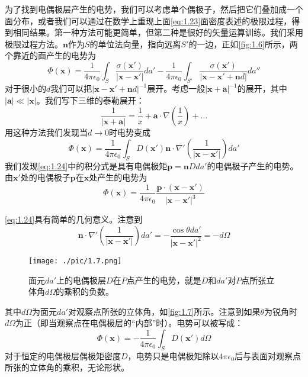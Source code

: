 \documentclass[12pt]{book}
\numberwithin{equation}{chapter}
\numberwithin{figure}{chapter}
\numberwithin{footnote}{page}
\begin{document}
为了找到电偶极层产生的电势，我们可以考虑单个偶极子，然后把它们叠加成一个面分布，或者我们可以通过在数学上重现上面\autoref{eq:1.23}面密度表述的极限过程，得到相同结果。第一种方法可能更简单，但第二种是很好的矢量运算训练。我们采用极限过程方法。$\mathbf{n}$作为$S$的单位法向量，指向远离$S'$的一边，正如\autoref{fig:1.6}所示，两个靠近的面产生的电势为
$$\Phi(\mathbf{x})=\frac{1}{4\pi\epsilon_0}\int_S\frac{\sigma(\mathbf{x'})}{|\mathbf{x}-\mathbf{x'}|}da'-\frac{1}{4\pi\epsilon_0}\int_{S'}\frac{\sigma(\mathbf{x'})}{|\mathbf{x}-\mathbf{x'}+\mathbf{n}d|}da''$$
对于很小的$d$我们可以把$|\mathbf{x}-\mathbf{x'}+\mathbf{n}d|^{-1}$展开。考虑一般$|\mathbf{x}+\mathbf{a}|^{-1}$的展开，其中$|\mathbf{a}|\ll |\mathbf{x}|$。我们写下三维的泰勒展开：
$$\frac{1}{|\mathbf{x}+\mathbf{a}|}=\frac{1}{x}+\mathbf{a}\cdot\nabla(\frac{1}{x})+\dots$$
用这种方法我们发现当$d\to 0$时电势变成
\begin{equation}\label{eq:1.24}
    \Phi(\mathbf{x})=\frac{1}{4\pi\epsilon_0}\int_S D(\mathbf{x'})\mathbf{n}\cdot\nabla'(\frac{1}{|\mathbf{x}-\mathbf{x'}|})da'
\end{equation}
我们发现\autoref{eq:1.24}中的积分式是具有电偶极矩$\mathbf{p}=\mathbf{n}Dda'$的电偶极子产生的电势。由$\mathbf{x'}$处的电偶极子$\mathbf{p}$在$\mathbf{x}$处产生的电势为
\begin{equation}\label{eq:1.25}
    \Phi(\mathbf{x})=\frac{1}{4\pi\epsilon_0}\frac{\mathbf{p}\cdot(\mathbf{x}-\mathbf{x'})}{|\mathbf{x}-\mathbf{x'}|^3}
\end{equation}

\autoref{eq:1.24}具有简单的几何意义。注意到
$$\mathbf{n}\cdot\nabla'(\frac{1}{|\mathbf{x}-\mathbf{x'}|})da'=-\frac{\cos \theta da'}{|\mathbf{x}-\mathbf{x'}|^2}=-d\Omega$$

\begin{figure}[!ht]
    \centering
    \texttt{[image: ./pic/1.7.png]}
    \captionsetup{justification=raggedright, singlelinecheck=false}
    \caption{面元$da'$上的电偶极层$D$在$P$点产生的电势，就是$D$和$da'$对$P$点所张立体角$d\Omega$的乘积的负数。}
    \label{fig:1.7}
\end{figure}

其中$d\Omega$为面元$da'$对观察点所张的立体角，如\autoref{fig:1.7}所示。注意到如果$\theta$为锐角时$d\Omega$为正（即当观察点在电偶极层的“内部”时）。电势可以被写成：
\begin{equation}\label{eq:1.26}
    \Phi(\mathbf{x})=-\frac{1}{4\pi\epsilon_0}\int_S D(\mathbf{x'})d\Omega
\end{equation}
对于恒定的电偶极层偶极矩密度$D$，电势只是电偶极矩除以$4\pi\epsilon_0$后与表面对观察点所张的立体角的乘积，无论形状。
\end{document}
